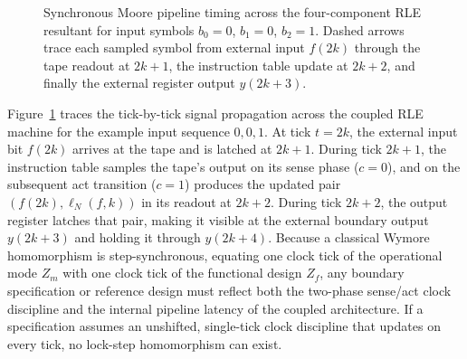 \begin{figure}[t]
{%
  }
  \caption{Synchronous Moore pipeline timing across the four-component RLE resultant for input symbols $b_0=0$, $b_1=0$, $b_2=1$. Dashed arrows trace each sampled symbol from external input $f(2k)$ through the tape readout at $2k+1$, the instruction table update at $2k+2$, and finally the external register output $y(2k+3)$.}
  \label{fig:rle-timing}
\end{figure}

Figure~\ref{fig:rle-timing} traces the tick-by-tick signal propagation across the coupled RLE machine for the example input sequence $0,0,1$. At tick $t=2k$, the external input bit $f(2k)$ arrives at the tape and is latched at $2k+1$. During tick $2k+1$, the instruction table samples the tape's output on its sense phase ($c=0$), and on the subsequent act transition ($c=1$) produces the updated pair $(f(2k),\ell_N(f,k))$ in its readout at $2k+2$. During tick $2k+2$, the output register latches that pair, making it visible at the external boundary output $y(2k+3)$ and holding it through $y(2k+4)$. Because a classical Wymore homomorphism is step-synchronous, equating one clock tick of the operational mode $Z_m$ with one clock tick of the functional design $Z_f$, any boundary specification or reference design must reflect both the two-phase sense/act clock discipline and the internal pipeline latency of the coupled architecture. If a specification assumes an unshifted, single-tick clock discipline that updates on every tick, no lock-step homomorphism can exist.


